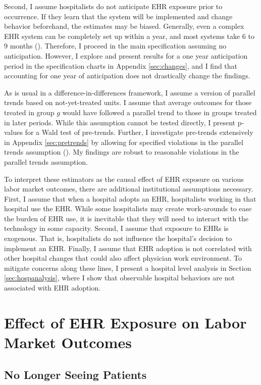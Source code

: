 \documentclass[12pt]{article}
\begin{document}
Second, I assume hospitalists do not anticipate EHR exposure prior to occurrence. If they learn that the system will be implemented and change behavior beforehand, the estimates may be biased. Generally, even a complex EHR system can be completely set up within a year, and most systems take 6 to 9 months (\cite{uzialko_2021}). Therefore, I proceed in the main specification assuming no anticipation. However, I explore and present results for a one year anticipation period in the specification charts in Appendix \ref{sec:changes}, and I find that accounting for one year of anticipation does not drastically change the findings.  

As is usual in a difference-in-differences framework, I assume a version of parallel trends based on not-yet-treated units. I assume that average outcomes for those treated in group $g$ would have followed a parallel trend to those in groups treated in later periods. While this assumption cannot be tested directly, I present p-values for a Wald test of pre-trends. Further, I investigate pre-trends extensively in Appendix \ref{sec:pretrends} by allowing for specified violations in the parallel trends assumption (\cite{rambachan2019honest}). My findings are robust to reasonable violations in the parallel trends assumption. 

To interpret these estimators as the causal effect of EHR exposure on various labor market outcomes, there are additional institutional assumptions necessary. First, I assume that when a hospital adopts an EHR, hospitalists working in that hospital use the EHR. While some hospitalists may create work-arounds to ease the burden of EHR use, it is inevitable that they will need to interact with the technology in some capacity. Second, I assume that exposure to EHRs is exogenous. That is, hospitalists do not influence the hospital's decision to implement an EHR. Finally, I assume that EHR adoption is not correlated with other hospital changes that could also affect physician work environment. To mitigate concerns along these lines, I present a hospital level analysis in Section \ref{sec:hospanalysis}, where I show that observable hospital behaviors are not associated with EHR adoption.


\section{Effect of EHR Exposure on Labor Market Outcomes}\label{sec:results}


\subsection{No Longer Seeing Patients}\label{sec:retire}
\end{document}
